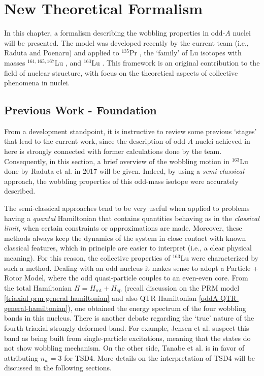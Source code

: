 \chapter{New Theoretical Formalism}
\label{chapter-6-aw1-formalism}

In this chapter, a formalism describing the wobbling properties in odd-$A$ nuclei will be presented. The model was developed recently by the current team (i.e., Raduta and Poenaru) and applied to $^{135}$Pr \cite{raduta2020new}, the `family' of Lu isotopes with masses $^{161,165,167}$Lu \cite{raduta2020approach}, and $^{163}$Lu \cite{raduta2020approach,raduta2020towards,poenaru2021parity,poenaru2021extensive1,poenaru2021extensive2}. This framework is an original contribution to the field of nuclear structure, with focus on the theoretical aspects of collective phenomena in nuclei.

\section{Previous Work - Foundation}
\label{foundation}

From a development standpoint, it is instructive to review some previous `stages' that lead to the current work, since the description of odd-$A$ nuclei achieved in here is strongly connected with former calculations done by the team. Consequently, in this section, a brief overview of the wobbling motion in $^{163}$Lu done by Raduta et al. in 2017 \cite{raduta2017semiclassical} will be given. Indeed, by using a \emph{semi-classical} approach, the wobbling properties of this odd-mass isotope were accurately described.

The semi-classical approaches tend to be very useful when applied to problems having a \emph{quantal} Hamiltonian that contains quantities behaving as in the \emph{classical limit}, when certain constraints or approximations are made. Moreover, these methods always keep the dynamics of the system in close contact with known classical features, which in principle are easier to interpret (i.e., a clear physical meaning). For this reason, the collective properties of $^{163}$Lu were characterized by such a method. Dealing with an odd nucleus it makes sense to adopt a Particle + Rotor Model, where the odd quasi-particle couples to an even-even core. From the total Hamiltonian $H=H_\text{rot}+H_\text{sp}$ (recall discussion on the PRM model \ref{triaxial-prm-general-hamiltonian} and also QTR Hamiltonian \ref{oddA-QTR-general-hamiltonian}), one obtained the energy spectrum of the four wobbling bands in this nucleus. There is another debate regarding the `true' nature of the fourth triaxial strongly-deformed band. For example, Jensen et al. \cite{jensen2004coexisting} suspect this band as being built from single-particle excitations, meaning that the states do not show wobbling mechanism. On the other side, Tanabe et al. \cite{tanabe2008selection} is in favor of attributing $n_w=3$ for TSD4. More details on the interpretation of TSD4 will be discussed in the following sections.

